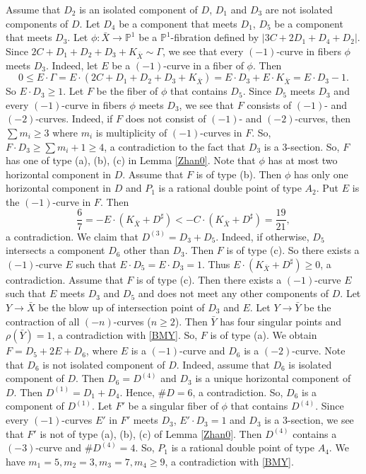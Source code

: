 \documentclass[10pt,oneside,reqno]{amsart}
\newcommand{\pp}{\mathbb{P}}
\theoremstyle{definition}
\theoremstyle{remark}
\numberwithin{equation}{section}
\begin{document}
Assume that $D_2$ is an isolated component of $D$, $D_1$ and $D_3$ are not isolated components of $D$. Let $D_4$ be a component that meets $D_1$, $D_5$ be a component that meets $D_3$.
Let $\phi\colon\bar{X}\rightarrow\pp^1$ be a $\pp^1$-fibration defined by $|3C+2D_1+D_4+D_2|$. Since $2C+D_1+D_2+D_3+K_{\bar{X}}\sim \Gamma$, we see that every $(-1)$-curve in fibers $\phi$ meets $D_3$. Indeed, let $E$ be a $(-1)$-curve in a fiber of $\phi$. Then $$0\leq E\cdot\Gamma=E\cdot(2C+D_1+D_2+D_3+K_{\bar{X}})=E\cdot D_3+E\cdot K_{\bar{X}}=E\cdot D_3-1.$$ So $E\cdot D_3\geq 1$. Let $F$ be the fiber of $\phi$ that contains $D_5$. Since $D_5$ meets $D_3$ and every $(-1)$-curve in fibers $\phi$ meets $D_3$, we see that $F$ consists of $(-1)$- and $(-2)$-curves. Indeed, if $F$ does not consist of $(-1)$- and $(-2)$-curves, then $\sum m_i\geq 3$ where $m_i$ is multiplicity of $(-1)$-curves in $F$. So, $F\cdot D_3\geq\sum m_i+1\geq 4$, a contradiction to the fact that $D_3$ is a $3$-section.  So, $F$ has one of type (a), (b), (c) in Lemma \ref{Zhan0}.
Note that $\phi$ has at most two horizontal component in $D$. Assume that $F$ is of type (b).
Then $\phi$ has only one horizontal component in $D$ and $P_1$ is a rational double point of type $A_2$. Put $E$ is the $(-1)$-curve in $F$. Then \[\frac{6}{7}=-E\cdot(K_{\bar{X}}+D^{\sharp})<-C\cdot(K_{\bar{X}}+D^{\sharp})=\frac{19}{21},\] a contradiction.
We claim that $D^{(3)}=D_3+D_5$. Indeed, if otherwise,  $D_5$ intersects a component $D_6$ other than $D_3$. Then $F$ is of type (c). So there exists a $(-1)$-curve $E$ such that $E\cdot D_5= E\cdot D_3=1$. Thus  $E\cdot(K_{\bar{X}}+D^{\sharp})\geq 0$, a contradiction.
Assume that $F$ is of type (c).  Then there exists a $(-1)$-curve $E$ such that $E$ meets $D_3$ and $D_5$ and does not meet any other components of $D$. Let $Y\rightarrow\bar{X}$ be the blow up of intersection point of $D_3$ and $E$. Let $Y\rightarrow\bar{Y}$ be the contraction of all $(-n)$-curves ($n\geq 2$). Then $\bar{Y}$ has four singular points and $\rho(\bar{Y})=1$, a contradiction with \ref{BMY}. So, $F$ is of type (a). We obtain $F=D_5+2E+D_6$, where $E$ is a $(-1)$-curve and $D_6$ is a $(-2)$-curve. Note that $D_6$ is not isolated component of $D$. Indeed, assume that $D_6$ is isolated component of $D$. Then $D_6=D^{(4)}$ and $D_3$ is a unique horizontal component of $D$. Then $D^{(1)}=D_1+D_4$. Hence, $\#D=6$, a contradiction. So, $D_6$ is a component of $D^{(1)}$. Let $F'$ be a singular fiber of $\phi$ that contains $D^{(4)}$. Since every $(-1)$-curves $E'$ in $F'$ meets $D_3$, $E'\cdot D_3=1$ and $D_3$ is a 3-section, we see that $F'$ is not of type (a), (b), (c) of Lemma \ref{Zhan0}. Then $D^{(4)}$ contains a $(-3)$-curve and $\# D^{(4)}=4$. So, $P_1$ is a rational double point of type $A_4$. We have $m_1=5, m_2=3, m_3=7, m_4\geq 9$, a contradiction with \ref{BMY}.
\end{document}
